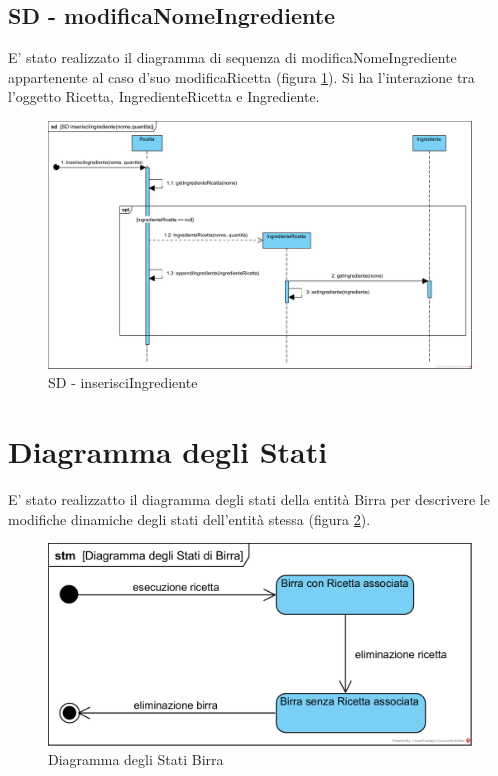 \documentclass[a4paper,12pt]{report}
\begin{document}
		\subsection{SD - modificaNomeIngrediente}
			E' stato realizzato il diagramma di sequenza di modificaNomeIngrediente appartenente al caso d'suo modificaRicetta (figura \ref{fig:SD-inserisciIngrediente}).
Si ha l'interazione tra l'oggetto Ricetta, IngredienteRicetta e Ingrediente.
			\begin{figure}[!h]
				\centering
				\includegraphics[width=01\linewidth]{image/SD-inserisciIngrediente.png}
				\caption{SD - inserisciIngrediente}\label{fig:SD-inserisciIngrediente}
			\end{figure}

         \section{Diagramma degli Stati}
         E' stato realizzatto il diagramma degli stati della entità Birra per descrivere le modifiche dinamiche degli stati dell'entità stessa (figura \ref{fig:stati-birra}).
		\begin{figure}[!h]
			\centering
			\includegraphics[width=0.8\linewidth]{image/Diagramma-degli-Stati-Birra.png}
			\caption{Diagramma degli Stati Birra}\label{fig:stati-birra}
		\end{figure}    			
\end{document}
